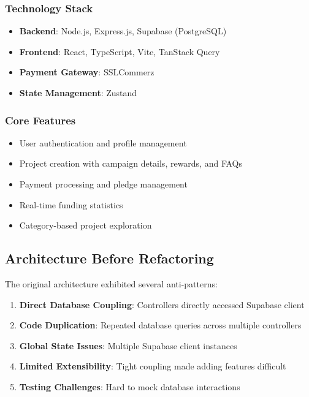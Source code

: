 \documentclass[12pt,a4paper]{article}
\begin{document}
\subsubsection{Technology Stack}
\begin{itemize}
    \item \textbf{Backend}: Node.js, Express.js, Supabase (PostgreSQL)
    \item \textbf{Frontend}: React, TypeScript, Vite, TanStack Query
    \item \textbf{Payment Gateway}: SSLCommerz
    \item \textbf{State Management}: Zustand
\end{itemize}

\subsubsection{Core Features}
\begin{itemize}
    \item User authentication and profile management
    \item Project creation with campaign details, rewards, and FAQs
    \item Payment processing and pledge management
    \item Real-time funding statistics
    \item Category-based project exploration
\end{itemize}

\subsection{Architecture Before Refactoring}

The original architecture exhibited several anti-patterns:

\begin{enumerate}
    \item \textbf{Direct Database Coupling}: Controllers directly accessed Supabase client
    \item \textbf{Code Duplication}: Repeated database queries across multiple controllers
    \item \textbf{Global State Issues}: Multiple Supabase client instances
    \item \textbf{Limited Extensibility}: Tight coupling made adding features difficult
    \item \textbf{Testing Challenges}: Hard to mock database interactions
\end{enumerate}
\end{document}
